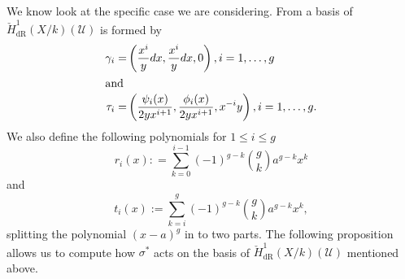 \documentclass[draft, 11pt]{article} %
\theoremstyle{plain}
\theoremstyle{remark}
\newcommand{\cU}{{\mathcal U}}
\newcommand{\cechderhamhone}{\check{H}_{\text {dR}}^1(X/k)}
\begin{document}
We know look at the specific case we are considering.
From \cite{derhamactions} a basis of $\cechderhamhone(\cU)$ is formed by
\begin{align*}
\gamma_i  = & \left( \frac{x^i}{y}dx, \frac{x^i}{y}dx, 0\right) , i=1, \ldots, g \\
\intertext{and}
\tau_i = & \left ( \frac{\psi_i(x)}{2yx^{i+1}}, \frac{\phi_i(x)}{2yx^{i+1}}, x^{-i}y \right), i=1,\ldots ,g.
\end{align*}
We also define the following polynomials for $1 \leq i \leq g$
\[
r_i(x) : = \sum_{k=0}^{i-1} (-1)^{g-k}\binom{g}{k} a^{g-k} x^k
\]
and
\[
t_i(x) := \sum_{k=i}^{g} (-1)^{g-k}\binom{g}{k} a^{g-k} x^k,
\]
splitting the polynomial $(x-a)^g$ in to two parts.
The following proposition allows us to compute how $\sigma^*$ acts on the basis of $\cechderhamhone(\cU)$ mentioned above.
\end{document}
